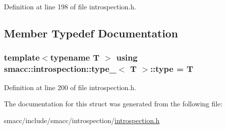 Definition at line 198 of file introspection.\+h.



\subsection{Member Typedef Documentation}
\subsubsection[{\texorpdfstring{type}{type}}]{\setlength{\rightskip}{0pt plus 5cm}template$<$typename T $>$ using {\bf smacc\+::introspection\+::type\+\_\+}$<$ T $>$\+::{\bf type} =  T}\hypertarget{structsmacc_1_1introspection_1_1type___afe9e4516cea9d3160f2eff1b787ca4f5}{}\label{structsmacc_1_1introspection_1_1type___afe9e4516cea9d3160f2eff1b787ca4f5}


Definition at line 200 of file introspection.\+h.



The documentation for this struct was generated from the following file\+:\begin{DoxyCompactItemize}
\item 
smacc/include/smacc/introspection/\hyperlink{introspection_8h}{introspection.\+h}\end{DoxyCompactItemize}

